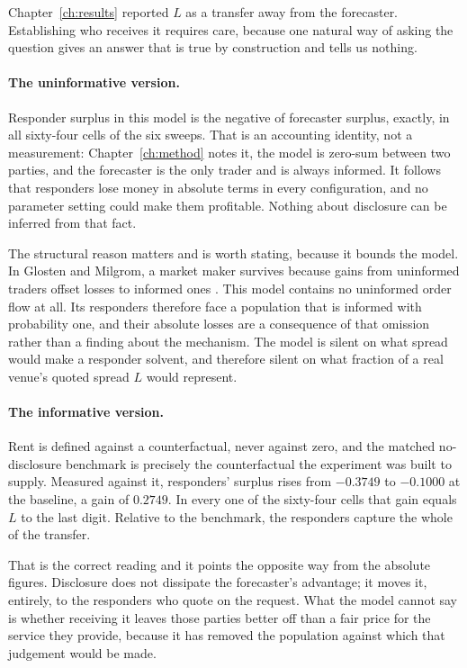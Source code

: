 Chapter~\ref{ch:results} reported $L$ as a transfer away from the forecaster. Establishing
who receives it requires care, because one natural way of asking the question gives an
answer that is true by construction and tells us nothing.

\paragraph{The uninformative version.} Responder surplus in this model is the negative of
forecaster surplus, exactly, in all sixty-four cells of the six sweeps. That is an accounting
identity, not a measurement: Chapter~\ref{ch:method} notes it, the model is zero-sum between
two parties, and the forecaster is the only trader and is always informed. It follows that
responders lose money in absolute terms in every configuration, and no parameter setting
could make them profitable. Nothing about disclosure can be inferred from that fact.

The structural reason matters and is worth stating, because it bounds the model. In Glosten
and Milgrom, a market maker survives because gains from uninformed traders offset losses to
informed ones \cite{glosten1985bidask}. This model contains no uninformed order flow at all.
Its responders therefore face a population that is informed with probability one, and their
absolute losses are a consequence of that omission rather than a finding about the
mechanism. The model is silent on what spread would make a responder solvent, and therefore
silent on what fraction of a real venue's quoted spread $L$ would represent.

\paragraph{The informative version.} Rent is defined against a counterfactual, never against
zero, and the matched no-disclosure benchmark is precisely the counterfactual the experiment
was built to supply. Measured against it, responders' surplus rises from $-0.3749$ to
$-0.1000$ at the baseline, a gain of $0.2749$. In every one of the sixty-four cells that gain
equals $L$ to the last digit. Relative to the benchmark, the responders capture the whole of
the transfer.

That is the correct reading and it points the opposite way from the absolute figures.
Disclosure does not dissipate the forecaster's advantage; it moves it, entirely, to the
responders who quote on the request. What the model cannot say is whether receiving it leaves
those parties better off than a fair price for the service they provide, because it has
removed the population against which that judgement would be made.

